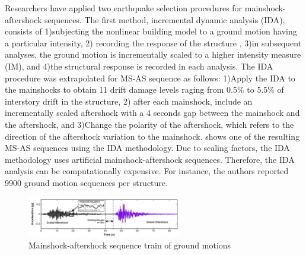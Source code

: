 Researchers have applied two earthquake selection procedures for mainshock-aftershock sequences. The first method, incremental dynamic analysis (IDA), consists of 1)subjecting the nonlinear building model to a ground motion having a particular intensity, 2) recording the response of the structure \cite{Vamvatsikos2002}, 3)in subsequent analyses, the ground motion is incrementally scaled to a higher intensity measure (IM), and 4)the structural response is recorded in each analysis. The IDA procedure was extrapolated for MS-AS sequence as follows: 1)Apply the IDA to the mainshocks to obtain 11 drift damage levels raging from 0.5\% to 5.5\% of interstory drift in the structure, 2) after each mainshock, include an incrementally scaled aftershock with a 4 seconds gap between the mainshock and the aftershock, and 3)Change the polarity of the aftershock, which refers to the direction of the aftershock variation to the mainshock.  shows one of the resulting MS-AS sequences using the IDA methodology. Due to scaling factors, the IDA methodology uses artificial mainshock-aftershock sequences. Therefore, the IDA analysis can be computationally expensive. For instance, the authors reported 9900 ground motion sequences per structure.

\begin{figure}[htbp]
\centering
\includegraphics[width=0.6\textwidth]{Chapter-2/figs/MS-AS_sequence_Luco}
\caption{Mainshock-aftershock sequence train of ground motions \cite{Raghunandan2015}}
\label{fig:MS-AS_Luco}
\end{figure}

